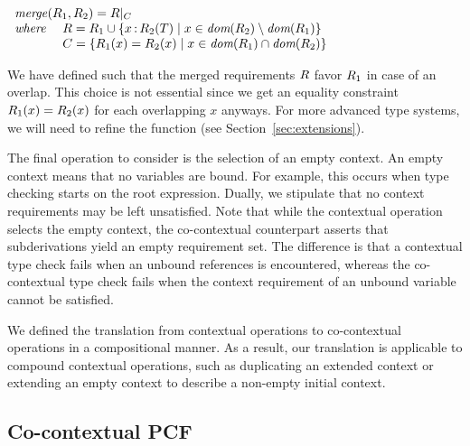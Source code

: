 \documentclass{llncs}
\begin{document}
\vspace{1ex}
$
\begin{array}{ll}
  \multicolumn{2}{l}{  \reqmerge{\reqs_1}{\reqs_2} = \reqs|_C} \\
  \textit{where}\ & R = \reqs_1 \cup \{x \ofType \reqs_2(T) \WHERE x \in \dom{\reqs_2} \setminus \dom{\reqs_1}\} \\
                  & C = \{\reqs_1(x) = \reqs_2(x) \WHERE x \in \dom{\reqs_1} \cap \dom{\reqs_2}\}
\end{array}
$
\vspace{1ex}

\noindent We have defined \reqmergeF such that the merged requirements $R$
favor $R_1$ in case of an overlap. This choice is not essential since we get
an equality constraint $R_1(x) = R_2(x) $ for each overlapping $x$
anyways.  For more advanced type systems, we will need to refine the \reqmergeF
function (see Section~\ref{sec:extensions}).

The final operation to consider is the selection of an empty context. An empty
context means that no variables are bound. For example, this occurs when type
checking starts on the root expression. Dually, we stipulate that no context
requirements may be left unsatisfied. Note that while the
contextual operation selects the empty context, the co-contextual
counterpart asserts that subderivations yield an empty requirement set. The
difference is that a contextual type check fails when an unbound references is
encountered, whereas the co-contextual type check fails when the context
requirement of an unbound variable cannot be satisfied.

We defined the translation from contextual operations to co-contextual
operations in a compositional manner. As a result, our translation is
applicable to compound contextual operations, such as duplicating an extended
context or extending an empty context to describe a non-empty initial
context.

\subsection{Co-contextual PCF}



\end{document}
